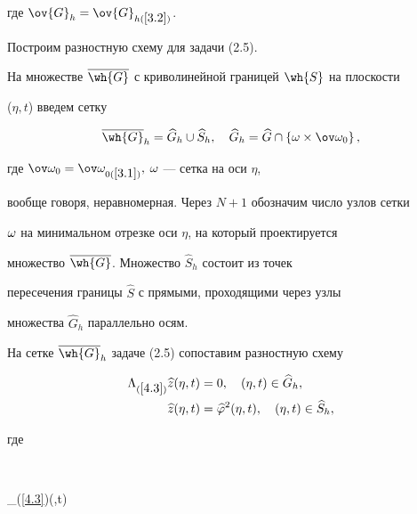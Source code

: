 где $\ov{G}_h=\ov{G}_{h(\ref{3.2})}$.





Построим разностную схему для задачи (2.5).


На множестве $\ovl{\wh{G}}$ с криволинейной границей $\wh{S}$ на плоскости


($\eta,t$) введем сетку 


\begin{equation}\label{4.2}


\ovl{\wh{G}}_h=\widehat{G}_h\cup\widehat{S}_h,\quad 


\widehat{G}_h=\widehat{G}\cap


\left\{\om\times\ovo_0\right\},


\end{equation}


где $\ovo_0=\ovo_{0(\ref{3.1})},$ $\omega$ --- сетка на оси $\eta$, 


вообще говоря, неравномерная. Через $N+1$ обозначим число узлов сетки


$\omega$ на минимальном отрезке оси $\eta$, на который проектируется


множество $\ovl{\wh{G}}$. Множество $\widehat{S}_h$ состоит из точек 


пересечения границы $\widehat{S}$ с прямыми, проходящими через узлы 


множества $\widehat{G}_h$ параллельно осям.





На сетке $\ovl{\wh{G}}_h$ задаче (2.5) сопоставим разностную схему


\begin{align}\label{4.3}


\begin{split}


\Lambda_{(\ref{4.3})}\widehat{z}(\eta,t)&= 0,\quad


(\eta,t)\in \widehat{G}_h,\\


\widehat{z}(\eta,t)&=\widehat{\vf}^2(\eta,t),\quad


(\eta,t)\in \widehat{S}_h,


\end{split}


\end{align}


где 


$$


\Lambda_{(\ref{4.3})}(\eta,t)\, \equiv 


